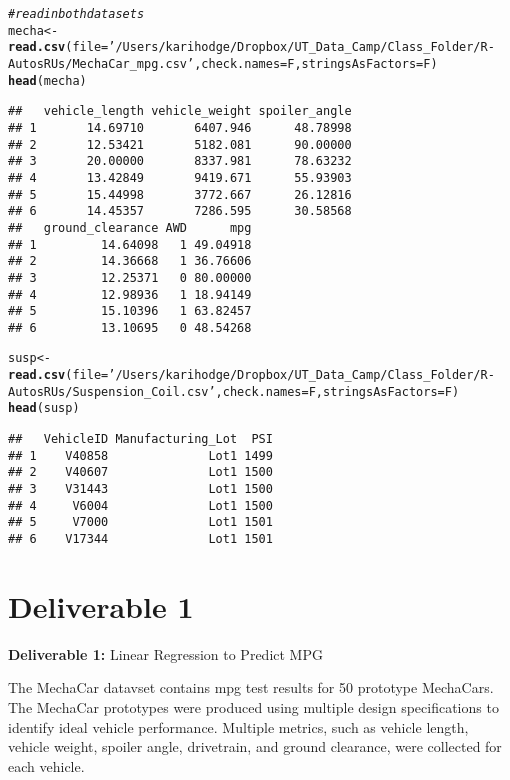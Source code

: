 \documentclass[a4paper, 12pt]{article}\usepackage[]{graphicx}\usepackage[]{color}
\makeatletter
\newcommand{\hlstr}[1]{\textcolor[rgb]{0.192,0.494,0.8}{#1}}%
\newcommand{\hlcom}[1]{\textcolor[rgb]{0.678,0.584,0.686}{\textit{#1}}}%
\newcommand{\hlstd}[1]{\textcolor[rgb]{0.345,0.345,0.345}{#1}}%
\newcommand{\hlkwb}[1]{\textcolor[rgb]{0.69,0.353,0.396}{#1}}%
\newcommand{\hlkwc}[1]{\textcolor[rgb]{0.333,0.667,0.333}{#1}}%
\newcommand{\hlkwd}[1]{\textcolor[rgb]{0.737,0.353,0.396}{\textbf{#1}}}%
\newenvironment{kframe}{%
 \def\at@end@of@kframe{}%
 \ifinner\ifhmode%
  \def\at@end@of@kframe{\end{minipage}}%
  \begin{minipage}{\columnwidth}%
 \fi\fi%
 \def\FrameCommand##1{\hskip\@totalleftmargin \hskip-\fboxsep
 \colorbox{shadecolor}{##1}\hskip-\fboxsep
     \hskip-\linewidth \hskip-\@totalleftmargin \hskip\columnwidth}%
 \MakeFramed {\advance\hsize-\width
   \@totalleftmargin\z@ \linewidth\hsize
   \@setminipage}}%
 {\par\unskip\endMakeFramed%
 \at@end@of@kframe}
\newenvironment{knitrout}{}{} %
\makeatother
\begin{document}
\begin{knitrout}
\color{fgcolor}\begin{kframe}
\begin{alltt}
\hlcom{# read in both data sets}
\hlstd{mecha}\hlkwb{<-}\hlkwd{read.csv}\hlstd{(}\hlkwc{file}\hlstd{=}\hlstr{'/Users/karihodge/Dropbox/UT_Data_Camp/Class_Folder/R-AutosRUs/MechaCar_mpg.csv'}\hlstd{,}\hlkwc{check.names}\hlstd{=F,}\hlkwc{stringsAsFactors} \hlstd{= F)}
\hlkwd{head}\hlstd{(mecha)}
\end{alltt}
\begin{verbatim}
##   vehicle_length vehicle_weight spoiler_angle
## 1       14.69710       6407.946      48.78998
## 2       12.53421       5182.081      90.00000
## 3       20.00000       8337.981      78.63232
## 4       13.42849       9419.671      55.93903
## 5       15.44998       3772.667      26.12816
## 6       14.45357       7286.595      30.58568
##   ground_clearance AWD      mpg
## 1         14.64098   1 49.04918
## 2         14.36668   1 36.76606
## 3         12.25371   0 80.00000
## 4         12.98936   1 18.94149
## 5         15.10396   1 63.82457
## 6         13.10695   0 48.54268
\end{verbatim}
\begin{alltt}
\hlstd{susp}\hlkwb{<-}\hlkwd{read.csv}\hlstd{(}\hlkwc{file}\hlstd{=}\hlstr{'/Users/karihodge/Dropbox/UT_Data_Camp/Class_Folder/R-AutosRUs/Suspension_Coil.csv'}\hlstd{,}\hlkwc{check.names}\hlstd{=F,}\hlkwc{stringsAsFactors} \hlstd{= F)}
\hlkwd{head}\hlstd{(susp)}
\end{alltt}
\begin{verbatim}
##   VehicleID Manufacturing_Lot  PSI
## 1    V40858              Lot1 1499
## 2    V40607              Lot1 1500
## 3    V31443              Lot1 1500
## 4     V6004              Lot1 1500
## 5     V7000              Lot1 1501
## 6    V17344              Lot1 1501
\end{verbatim}
\end{kframe}
\end{knitrout}

\section{Deliverable 1}
\textbf{Deliverable 1:} Linear Regression to Predict MPG

The MechaCar datavset contains mpg test results for 50 prototype MechaCars. The MechaCar prototypes were produced using multiple design specifications to identify ideal vehicle performance. Multiple metrics, such as vehicle length, vehicle weight, spoiler angle, drivetrain, and ground clearance, were collected for each vehicle.
\end{document}
